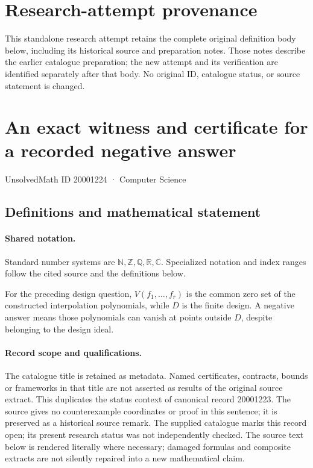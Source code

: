 \documentclass[11pt]{article}
\begin{document}
\section*{Research-attempt provenance}
This standalone research attempt retains the complete original definition body below,
including its historical source and preparation notes. Those notes describe the
earlier catalogue preparation; the new attempt and its verification are identified
separately after that body. No original ID, catalogue status, or source statement is changed.

\section{An exact witness and certificate for a recorded negative answer}\label{20001224}
{\small UnsolvedMath ID 20001224 · Computer Science}
\subsection{Definitions and mathematical statement}

\paragraph{Shared notation.}Standard number systems are $\mathbb N,\mathbb Z,\mathbb Q,\mathbb R,\mathbb C$. Specialized notation and index ranges follow the cited source and the definitions below.


For the preceding design question, $V(f_1,\ldots,f_r)$ is the common zero set of the constructed interpolation polynomials, while $D$ is the finite design. A negative answer means those polynomials can vanish at points outside $D$, despite belonging to the design ideal.
\paragraph{Record scope and qualifications.}
The catalogue title is retained as metadata. Named certificates, contracts, bounds or frameworks in that title are not asserted as results of the original source extract.
This duplicates the status context of canonical record 20001223. The source gives no counterexample coordinates or proof in this sentence; it is preserved as a historical source remark. The supplied catalogue marks this record open; its present research status was not independently checked.
The source text below is rendered literally where necessary; damaged formulas and composite extracts are not silently repaired into a new mathematical claim.
\end{document}
